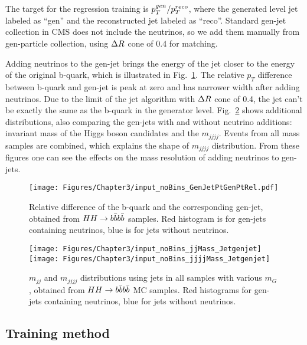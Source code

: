 The target for the regression training is $p_{T}^{gen}/p_{T}^{reco}$,
where the generated level jet labeled as ``gen'' and the reconstructed jet labeled as ``reco''.
Standard gen-jet collection in CMS does not include the neutrinos, 
so we add them manually from gen-particle collection, using $\Delta R$ cone of 0.4 for matching.

Adding neutrinos to the gen-jet brings the energy of the jet closer to the energy of the original b-quark, which is illustrated in Fig.~\ref{fig:b-reg-quark}.
The relative $p_{T}$ difference between b-quark and gen-jet is peak at zero and has narrower width after adding neutrinos.
Due to the limit of the jet algorithm with $\Delta R$ cone of 0.4, the jet can't be exactly the same as the b-quark in the generator level.
Fig.~\ref{fig:b-reg-jet-neutrino} shows additional distributions, also comparing the gen-jets with and without neutrino additions: invariant mass of the Higgs boson candidates and the $m_{jjjj}$. 
Events from all mass samples are combined, which explains the shape of $m_{jjjj}$ distribution. 
From these figures one can see the effects on the mass resolution of adding neutrinos to gen-jets.

\begin{figure}[h]
  \centering
  \texttt{[image: Figures/Chapter3/input\_noBins\_GenJetPtGenPtRel.pdf]}
  \caption{Relative \PT difference of the b-quark and the
    corresponding gen-jet, obtained from $HH\to b\bar{b}b\bar{b}$ samples. Red
    histogram is for gen-jets containing neutrinos, blue is for jets
    without neutrinos.}
  \label{fig:b-reg-quark}
\end{figure}

\begin{figure*}[h]
  \centering
  \texttt{[image: Figures/Chapter3/input\_noBins\_jjMass\_Jetgenjet]}\hfil
  \texttt{[image: Figures/Chapter3/input\_noBins\_jjjjMass\_Jetgenjet]}\hfil
  \caption{$m_{jj}$ and $m_{jjjj}$ distributions using jets in all samples with
    various $m_G$, obtained from $HH\to b\bar{b}b\bar{b}$ MC samples. Red
    histograms for gen-jets containing neutrinos, blue for jets
    without neutrinos.}
  \label{fig:b-reg-jet-neutrino}
\end{figure*}

\subsection{Training method}

